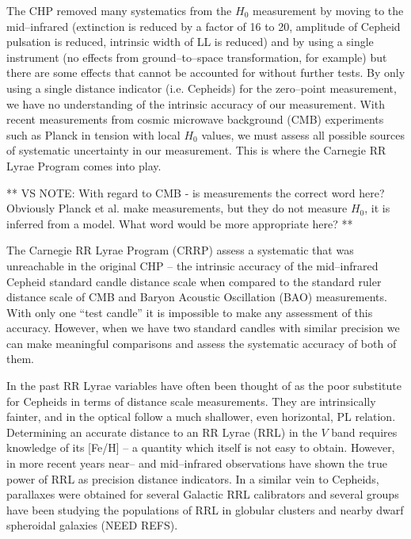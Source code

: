 \documentclass[a4paper,fleqn,usenatbib]{mnras}
\begin{document}
The CHP removed many systematics from the $H_{0}$ measurement by moving to the mid--infrared (extinction is reduced by a factor of 16 to 20, amplitude of Cepheid pulsation is reduced, intrinsic width of LL is reduced) and by using a single instrument (no effects from ground--to--space transformation, for example) but there are some effects that cannot be accounted for without further tests. By only using a single distance indicator (i.e. Cepheids) for the zero--point measurement, we have no understanding of the intrinsic accuracy of our measurement. With recent measurements from cosmic microwave background (CMB) experiments such as Planck \citep{2015arXiv150201589P} in tension with local $H_{0}$ values, we must assess all possible sources of systematic uncertainty in our measurement. This is where the Carnegie RR Lyrae Program comes into play.

** VS NOTE: With regard to CMB - is measurements the correct word here? Obviously Planck et al. make measurements, but they do not measure $H_{0}$, it is inferred from a model. What word would be more appropriate here? **

The Carnegie RR Lyrae Program (CRRP) assess a systematic that was unreachable in the original CHP -- the intrinsic accuracy of the mid--infrared Cepheid standard candle distance scale when compared to the standard ruler distance scale of CMB and Baryon Acoustic Oscillation (BAO) measurements. With only one ``test candle'' it is impossible to make any assessment of this accuracy. However, when we have two standard candles with similar precision we can make meaningful comparisons and assess the systematic accuracy of both of them.

In the past RR Lyrae variables have often been thought of as the poor substitute for Cepheids in terms of distance scale measurements. They are intrinsically fainter, and in the optical follow a much shallower, even horizontal, PL relation. Determining an accurate distance to an RR Lyrae (RRL) in the $V$ band requires knowledge of its [Fe/H] -- a quantity which itself is not  easy to obtain. However, in more recent years near-- and mid--infrared observations have shown the true power of RRL as precision distance indicators. In a similar vein to Cepheids,  parallaxes were obtained for several Galactic RRL calibrators \citet{2011AJ....142..187B} and several groups have been studying the populations of RRL in globular clusters and nearby dwarf spheroidal galaxies (NEED REFS). 
\end{document}
